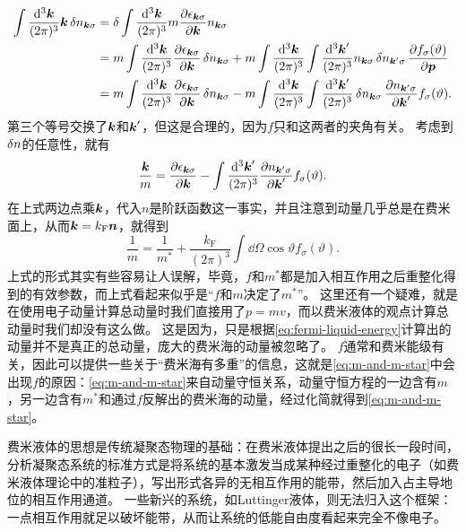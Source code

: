 \documentclass[hyperref, UTF8, a4paper]{ctexart}
\begin{document}
\[
    \begin{aligned}
        \int \frac{\dd[3]{\vb*{k}}}{(2\pi)^3} \vb*{k} \var{n_{\vb*{k} \sigma}} &= \var \int \frac{\dd[3]{\vb*{k}}}{(2\pi)^3} m \pdv{\epsilon_{\vb*{k} \sigma}}{\vb*{k}} n_{\vb*{k} \sigma} \\
        &= m \int \frac{\dd[3]{\vb*{k}}}{(2\pi)^3} \pdv{\epsilon_{\vb*{k} \sigma}}{\vb*{k}} \var{n_{\vb*{k} \sigma}} + m \int \frac{\dd[3]{\vb*{k}}}{(2\pi)^3} \int \frac{\dd[3]{\vb*{k}'}}{(2\pi)^3} n_{\vb*{k} \sigma} \var{n_{\vb*{k}' \sigma}} \pdv{f_{\sigma}(\vartheta)}{\vb*{p}} \\
        &= m \int \frac{\dd[3]{\vb*{k}}}{(2\pi)^3} \pdv{\epsilon_{\vb*{k} \sigma}}{\vb*{k}} \var{n_{\vb*{k} \sigma}} - m \int \frac{\dd[3]{\vb*{k}}}{(2\pi)^3} \int \frac{\dd[3]{\vb*{k}'}}{(2\pi)^3} \var{n_{\vb*{k} \sigma}} \pdv{n_{\vb*{k}' \sigma}}{\vb*{k}'} f_{\sigma}(\vartheta) .
    \end{aligned}
\]
第三个等号交换了$\vb*{k}$和$\vb*{k}'$，但这是合理的，因为$f$只和这两者的夹角有关。
考虑到$\var{n}$的任意性，就有
\[
    \frac{\vb*{k}}{m} = \pdv{\epsilon_{\vb*{k} \sigma}}{\vb*{k}} - \int \frac{\dd[3]{\vb*{k}'}}{(2\pi)^3} \pdv{n_{\vb*{k}' \sigma}}{\vb*{k}'} f_{\sigma}(\vartheta).
\]
在上式两边点乘$\vb*{k}$，代入$n$是阶跃函数这一事实，并且注意到动量几乎总是在费米面上，从而$\vb*{k} = k_\text{F} \vb*{n}$，就得到
\begin{equation}
    \frac{1}{m} = \frac{1}{m^*} + \frac{k_\text{F}}{(2\pi)^3} \int \dd{\Omega} \cos \vartheta f_\sigma(\vartheta).
    \label{eq:m-and-m-star}
\end{equation}
上式的形式其实有些容易让人误解，毕竟，$f$和$m^*$都是加入相互作用之后重整化得到的有效参数，而上式看起来似乎是“$f$和$m$决定了$m^*$”。
这里还有一个疑难，就是在使用电子动量计算总动量时我们直接用了$p=mv$，而以费米液体的观点计算总动量时我们却没有这么做。
这是因为，只是根据\eqref{eq:fermi-liquid-energy}计算出的动量并不是真正的总动量，庞大的费米海的动量被忽略了。
$f$通常和费米能级有关，因此可以提供一些关于“费米海有多重”的信息，这就是\eqref{eq:m-and-m-star}中会出现$f$的原因：\eqref{eq:m-and-m-star}来自动量守恒关系，动量守恒方程的一边含有$m$，另一边含有$m^*$和通过$f$反解出的费米海的动量，经过化简就得到\eqref{eq:m-and-m-star}。

费米液体的思想是传统凝聚态物理的基础：在费米液体提出之后的很长一段时间，分析凝聚态系统的标准方式是将系统的基本激发当成某种经过重整化的电子（如费米液体理论中的准粒子），写出形式各异的无相互作用的能带，然后加入占主导地位的相互作用通道。
一些新兴的系统，如Luttinger液体，则无法归入这个框架：一点相互作用就足以破坏能带，从而让系统的低能自由度看起来完全不像电子。
\end{document}
